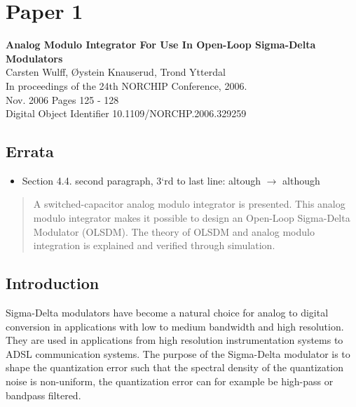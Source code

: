 \chapter{Paper 1}\label{sc:p1}
\textbf{\Large Analog Modulo Integrator For Use In Open-Loop Sigma-Delta
  Modulators}\\
\indent Carsten Wulff, {\O}ystein Knauserud, Trond Ytterdal\\
\indent In proceedings of the 24th NORCHIP Conference, 2006.\\
\indent Nov. 2006 Pages 125 - 128\\
\indent Digital Object Identifier 10.1109/NORCHP.2006.329259 \\

\renewcommand\myfigname{p3fig:}
\renewcommand\myeqname{p3eq:}

\section*{Errata}
\begin{itemize}
\item Section 4.4. second paragraph, 3`rd to last line: altough $\rightarrow$ although
\end{itemize}

\begin{abstract}
A switched-capacitor analog modulo integrator is presented. This analog modulo
integrator makes it possible to design  
an Open-Loop Sigma-Delta Modulator (OLSDM). The theory of OLSDM and
analog modulo integration is explained and verified through simulation.


\end{abstract}
\section{Introduction}
Sigma-Delta modulators have become a natural choice for analog
to digital conversion in applications with low to medium bandwidth
and high resolution. They are used in applications from high
resolution instrumentation systems to ADSL communication systems. The purpose of the Sigma-Delta modulator is to shape the
quantization error such that the spectral density of the quantization
noise is non-uniform, the quantization error can for example be
high-pass or bandpass filtered. 

